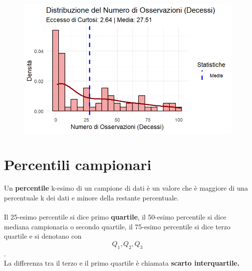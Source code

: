 \documentclass[14pt, openany, titlepage]{report} %
\begin{document}
\begin{figure}[H] 
    \centering
    \includegraphics[width=12cm, height=7cm]{Rplot07.png} 
\end{figure}

\chapter{Percentili campionari}
Un \textbf{percentile} k-esimo di un campione di dati è un valore che 
è maggiore di una percentuale k dei dati e minore della 
restante percentuale. \\\\
\noindent
Il 25-esimo percentile si dice primo \textbf{quartile}, il 50-esimo percentile
si dice mediana campionaria o secondo quartile, il 75-esimo percentile
si dice terzo quartile e si denotano con \[Q_{1}, Q_{2}, Q_{3} \].\\
La differenza tra il terzo e il primo quartile è chiamata \textbf{scarto interquartile.}
\end{document}
